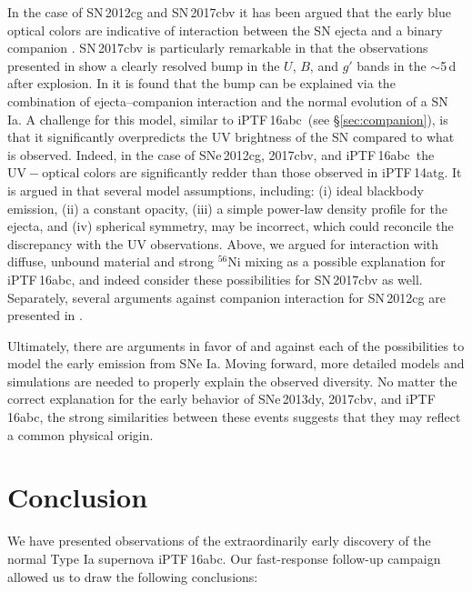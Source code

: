 \documentclass[twocolumn]{aastex61}
\newcommand{\abc}{iPTF\,16abc}
\begin{document}
In the case of SN\,2012cg and SN\,2017cbv it has been argued that the early
blue optical colors are indicative of interaction between the SN ejecta and a
binary companion \citep{2016ApJ...820...92M,2017ApJ...845L..11H}. SN\,2017cbv
is particularly remarkable in that the observations presented in
\citet{2017ApJ...845L..11H} show a clearly resolved bump in the $U$, $B$, and
$g'$ bands in the $\sim$5\,d after explosion. In
\citeauthor{2017ApJ...845L..11H} it is found that the bump can be explained
via the combination of ejecta--companion interaction and the normal evolution
of a SN Ia. A challenge for this model, similar to \abc\ (see
\S\ref{sec:companion}), is that it significantly overpredicts the UV
brightness of the SN compared to what is observed. Indeed, in the case of
SNe\,2012cg, 2017cbv, and \abc\ the $\mathrm{UV} - \mathrm{optical}$ colors
are significantly redder than those observed in iPTF\,14atg. It is argued in
\citet{2017ApJ...845L..11H} that several model assumptions, including: (i)
ideal blackbody emission, (ii) a constant opacity, (iii) a simple power-law
density profile for the ejecta, and (iv) spherical symmetry, may be incorrect,
which could reconcile the discrepancy with the UV observations. Above, we
argued for interaction with diffuse, unbound material and strong
$^{56}$Ni mixing as a possible explanation for \abc, and indeed
\citet{2017ApJ...845L..11H} consider these possibilities for SN\,2017cbv as
well. Separately, several arguments against companion interaction for
SN\,2012cg are presented in \citet{2016arXiv161007601S}.

Ultimately, there are arguments in favor of and against each of the
possibilities to model the early emission from SNe Ia. Moving
forward, more detailed models and simulations are needed to properly explain
the observed diversity. No matter the correct explanation for the early
behavior of SNe\,2013dy, 2017cbv, and \abc, the strong similarities between
these events suggests that they may reflect a common physical origin.

\section{Conclusion}
\label{sec:conclusion}

We have presented observations of the extraordinarily early discovery of the 
normal Type Ia supernova \abc. Our fast-response follow-up 
campaign allowed us to draw the following conclusions:
\end{document}
